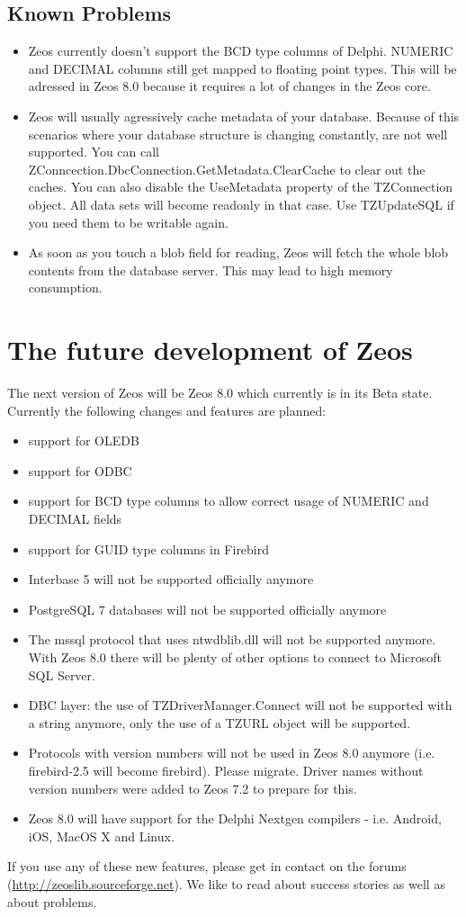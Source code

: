 \documentclass[a4paper,12pt,oneside]{book}
\begin{document}
\section{Known Problems}
\label{sec:Rev4_KnownProblems}
\begin{itemize}
\item 
  Zeos currently doesn't support the BCD type columns of Delphi.
	NUMERIC and DECIMAL columns still get mapped to floating point types.
	This will be adressed in Zeos 8.0 because it requires a lot of changes in the Zeos core.
\item
  Zeos will usually agressively cache metadata of your database.
	Because of this scenarios where your database structure is changing constantly, are not well supported.
	You can call ZConncection.\-DbcConnection.\-GetMetadata.\-ClearCache to clear out the caches.
	You can also disable the UseMetadata property of the TZConnection object.
	All data sets will become readonly in that case.
	Use TZUpdateSQL if you need them to be writable again.
\item
  As soon as you touch a blob field for reading, Zeos will fetch the whole blob contents from the database server.
	This may lead to high memory consumption.
\end{itemize}

\chapter{The future development of Zeos}
\label{chap:FutureDevelopmentOfZeosRev}
The next version of Zeos will be Zeos 8.0 which currently is in its Beta state.
Currently the following changes and features are planned:
\begin{itemize}
\item support for OLEDB
\item support for ODBC
\item support for BCD type columns to allow correct usage of NUMERIC and DECIMAL fields
\item support for GUID type columns in Firebird
\item Interbase 5 will not be supported officially anymore
\item PostgreSQL 7 databases will not be supported officially anymore
\item 
  The mssql protocol that uses ntwdblib.dll will not be supported anymore.
  With Zeos 8.0 there will be plenty of other options to connect to Microsoft SQL Server.
\item DBC layer: the use of TZDriverManager.Connect will not be supported with a string anymore, only the use of a TZURL object will be supported.
\item
  Protocols with version numbers will not be used in Zeos 8.0 anymore (i.e. firebird-2.5 will become firebird).
  Please migrate.
  Driver names without version numbers were added to Zeos 7.2 to prepare for this.
\item
  Zeos 8.0 will have support for the Delphi Nextgen compilers - i.e. Android, iOS, MacOS X and Linux.
\end{itemize}
If you use any of these new features, please get in contact on the forums (\url{http://zeoslib.sourceforge.net}).
We like to read about success stories as well as about problems.
\end{document}

